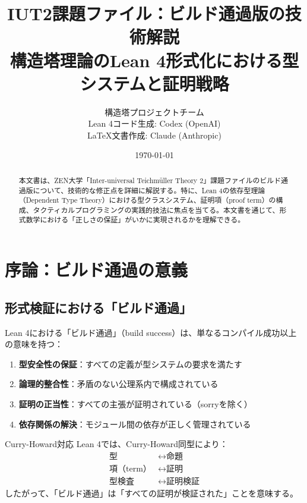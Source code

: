 \documentclass{ltjsarticle}
\title{\textbf{IUT2課題ファイル：ビルド通過版の技術解説}\\
\large 構造塔理論のLean 4形式化における型システムと証明戦略}
\author{構造塔プロジェクトチーム\\
Lean 4コード生成: Codex (OpenAI)\\
\LaTeX{}文書作成: Claude (Anthropic)}
\date{\today}
\begin{document}
\maketitle

\begin{abstract}
本文書は、ZEN大学「Inter-universal Teichmüller Theory 2」課題ファイルのビルド通過版について、技術的な修正点を詳細に解説する。特に、Lean 4の依存型理論（Dependent Type Theory）における型クラスシステム、証明項（proof term）の構成、タクティカルプログラミングの実践的技法に焦点を当てる。本文書を通じて、形式数学における「正しさの保証」がいかに実現されるかを理解できる。
\end{abstract}

\tableofcontents
\newpage

\section{序論：ビルド通過の意義}

\subsection{形式検証における「ビルド通過」}

Lean 4における「ビルド通過」（build success）は、単なるコンパイル成功以上の意味を持つ：

\begin{enumerate}
\item \textbf{型安全性の保証}：すべての定義が型システムの要求を満たす
\item \textbf{論理的整合性}：矛盾のない公理系内で構成されている
\item \textbf{証明の正当性}：すべての主張が証明されている（sorryを除く）
\item \textbf{依存関係の解決}：モジュール間の依存が正しく管理されている
\end{enumerate}

\begin{techbox}{Curry-Howard対応}
Lean 4では、Curry-Howard同型により：
\begin{align*}
\text{型} &\leftrightarrow \text{命題} \\
\text{項（term）} &\leftrightarrow \text{証明} \\
\text{型検査} &\leftrightarrow \text{証明検証}
\end{align*}
したがって、「ビルド通過」は「すべての証明が検証された」ことを意味する。
\end{techbox}
\end{document}
